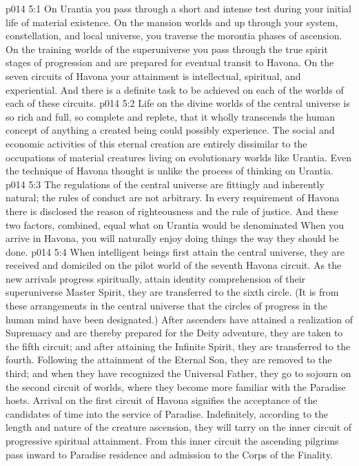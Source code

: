 \vs p014 5:1 On Urantia you pass through a short and intense test during your initial life of material existence. On the mansion worlds and up through your system, constellation, and local universe, you traverse the morontia phases of ascension. On the training worlds of the superuniverse you pass through the true spirit stages of progression and are prepared for eventual transit to Havona. On the seven circuits of Havona your attainment is intellectual, spiritual, and experiential. And there is a definite task to be achieved on each of the worlds of each of these circuits.
\vs p014 5:2 Life on the divine worlds of the central universe is so rich and full, so complete and replete, that it wholly transcends the human concept of anything a created being could possibly experience. The social and economic activities of this eternal creation are entirely dissimilar to the occupations of material creatures living on evolutionary worlds like Urantia. Even the technique of Havona thought is unlike the process of thinking on Urantia.\plusone
\vs p014 5:3 The regulations of the central universe are fittingly and inherently natural; the rules of conduct are not arbitrary. In every requirement of Havona there is disclosed the reason of righteousness and the rule of justice. And these two factors, combined, equal what on Urantia would be denominated  When you arrive in Havona, you will naturally enjoy doing things the way they should be done.
\pc \vs p014 5:4 When intelligent beings first attain the central universe, they are received and domiciled on the pilot world of the seventh Havona circuit. As the new arrivals progress spiritually, attain identity comprehension of their superuniverse Master Spirit, they are transferred to the sixth circle. (It is from these arrangements in the central universe that the circles of progress in the human mind have been designated.) After ascenders have attained a realization of Supremacy and are thereby prepared for the Deity adventure, they are taken to the fifth circuit; and after attaining the Infinite Spirit, they are transferred to the fourth. Following the attainment of the Eternal Son, they are removed to the third; and when they have recognized the Universal Father, they go to sojourn on the second circuit of worlds, where they become more familiar with the Paradise hosts. Arrival on the first circuit of Havona signifies the acceptance of the candidates of time into the service of Paradise. Indefinitely, according to the length and nature of the creature ascension, they will tarry on the inner circuit of progressive spiritual attainment. From this inner circuit the ascending pilgrims pass inward to Paradise residence and admission to the Corps of the Finality.
